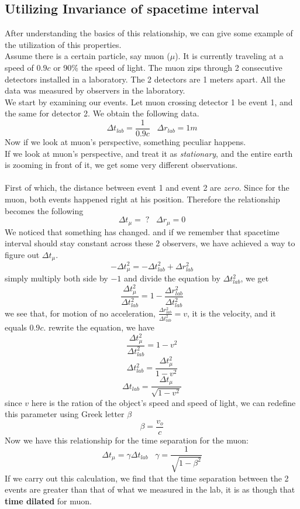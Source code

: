 \documentclass[12pt]{book}
\begin{document}
\subsection{Utilizing Invariance of spacetime interval}
After understanding the basics of this relationship, we can give some example of the utilization of this properties.\\
\newline
Assume there is a certain particle, say muon ($\mu$). It is currently traveling at a speed of $0.9c$ or 90\% the speed of light. The muon zips through 2 consecutive detectors installed in a laboratory. The 2 detectors are 1 meters apart. All the data was measured by observers in the laboratory. \\
\newline
We start by examining our events. Let muon crossing detector 1 be event 1, and the same for detector 2. We obtain the following data.
\[
\Delta t_{lab} = \frac{1}{0.9c} \;\;\; \Delta r_{lab} = 1m
\]
Now if we look at muon's perspective, something peculiar happens. \\
\newline 
If we look at muon's perspective, and treat it as \textit{stationary}, and the entire earth is zooming in front of it, we get some very different observations.\\
\\
First of which, the distance between event 1 and event 2 are $zero$. Since for the muon, both events happened right at his position. Therefore the relationship becomes the following
\[
\Delta t_\mu = \;? \;\;\; \Delta r_\mu = 0
\]
We noticed that something has changed. and if we remember that spacetime interval should stay constant across these 2 observers, we have achieved a way to figure out $\Delta t_\mu$.
\[
-\Delta t_\mu^2 = -\Delta t_{lab}^2 +\Delta r_{lab}^2
\]
simply multiply both side by $-1$ and divide the equation by $\Delta t_{lab}^2$, we get 
\[
\frac{\Delta t_\mu^2}{\Delta t_{lab}^2} = 1 - \frac{\Delta r_{lab}^2}{\Delta t_{lab}^2}
\]
we see that, for motion of no acceleration, $\frac{\Delta r_{lab}^2}{\Delta t_{lab}^2} = v$, it is the velocity, and it equals $0.9c$.
rewrite the equation, we have
\[
\frac{\Delta t_\mu^2}{\Delta t_{lab}^2} = 1-v^2
\]
\[
\Delta t_{lab}^2 = \frac{\Delta t_\mu^2}{1-v^2}
\]
\[
\Delta t_{lab} = \frac{\Delta t_\mu}{\sqrt{1-v^2}}
\]
since $v$ here is the ration of the object's speed and speed of light, we can redefine this parameter using Greek letter $\beta$
\[
\beta = \frac{v_o}{c}
\]
Now we have this relationship for the time separation for the muon:
\[
\Delta t_\mu = \gamma \Delta t_{lab} \;\;\; \gamma = \frac{1}{\sqrt{1-\beta^2}}
\]
\label{time dilation derivation}
If we carry out this calculation, we find that the time separation between the 2 events are greater than that of what we measured in the lab, it is as though that \textbf{time dilated} for muon. 
\end{document}
